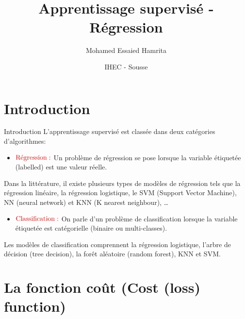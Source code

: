 \documentclass[
  8pt,
  ignorenonframetext,
]{beamer}
\title{Apprentissage supervisé - Régression}
\author{Mohamed Essaied Hamrita}
\date{IHEC - Sousse}
\providecommand{\tightlist}{%
  \setlength{\itemsep}{0pt}\setlength{\parskip}{0pt}}
\begin{document}
\frame{\titlepage}

\begin{frame}[allowframebreaks]
  \tableofcontents[hideallsubsections]
\end{frame}
\begin{frame}
\end{frame}

\hypertarget{introduction}{%
\section{Introduction}\label{introduction}}

\begin{frame}{Introduction}
L'apprentissage supervisé est classée dans deux catégories
d'algorithmes:\pause

\begin{itemize}
\tightlist
\item
  \(\color{red}{\bf{\text{Régression}:}}\) Un problème de régression se
  pose lorsque la variable étiquetée (labelled) est une valeur
  réelle.\pause 
\end{itemize}

Dans la littérature, il existe plusieurs types de modèles de régression
tels que la régression linéaire, la régression logistique, le SVM
(Support Vector Machine), NN (neural network) et KNN (K nearest
neighbour), \ldots \pause

\begin{itemize}
\tightlist
\item
  \(\color{red}{\bf{\text{Classification}:}}\) On parle d'un problème de
  classification lorsque la variable étiquetée est catégorielle (binaire
  ou multi-classes).\pause
\end{itemize}

Les modèles de classification comprennent la régression logistique,
l'arbre de décision (tree decision), la forêt aléatoire (random forest),
KNN et SVM.

\vspace*{3cm}
\end{frame}

\hypertarget{la-fonction-couxfbt-cost-loss-function}{%
\section{La fonction coût (Cost (loss)
function)}\label{la-fonction-couxfbt-cost-loss-function}}
\end{document}
